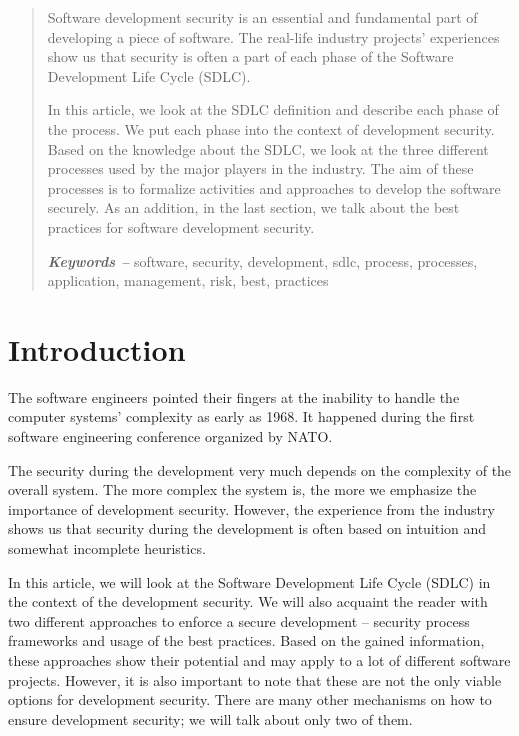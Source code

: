 \documentclass[12pt,a4,twoside]{article}
\providecommand{\keywords}[1]
{
    \small	
    \textbf{\textit{Keywords -- }} #1
}
\begin{document}
\newpage

\begin{abstract}

Software development security is an essential and fundamental part of developing a piece of software. The real-life industry projects' experiences show us that security is often a part of each phase of the Software Development Life Cycle (SDLC).

In this article, we look at the SDLC definition and describe each phase of the process. We put each phase into the context of development security. Based on the knowledge about the SDLC, we look at the three different processes used by the major players in the industry. The aim of these processes is to formalize activities and approaches to develop the software securely. As an addition, in the last section, we talk about the best practices for software development security.\\

\noindent
\keywords{software, security, development, sdlc, process, processes, application, management, risk, best, practices}
\end{abstract}

\tableofcontents
\newpage

\section*{Introduction}

The software engineers pointed their fingers at the inability to handle the computer systems' complexity as early as 1968. It happened during the first software engineering conference organized by NATO. \cite{randell19961968} 

The security during the development very much depends on the complexity of the overall system. The more complex the system is, the more we emphasize the importance of development security. However, the experience from the industry shows us that security during the development is often based on intuition and somewhat incomplete heuristics.

In this article, we will look at the Software Development Life Cycle (SDLC) in the context of the development security. We will also acquaint the reader with two different approaches to enforce a secure development -- security process frameworks and usage of the best practices. Based on the gained information, these approaches show their potential and may apply to a lot of different software projects. However, it is also important to note that these are not the only viable options for development security. There are many other mechanisms on how to ensure development security; we will talk about only two of them.
\end{document}
